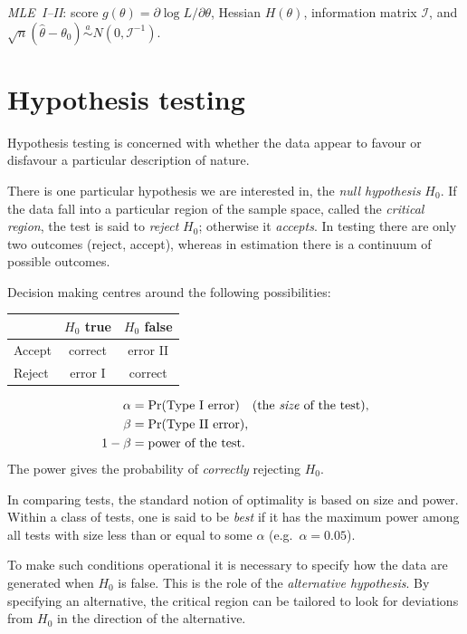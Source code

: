 \documentclass[11pt]{article}
\begin{document}

 \emph{MLE~I--II}: score $g(\theta)=\partial\log L/\partial\theta$, Hessian $H(\theta)$,
information matrix $\mathcal I$, and $\sqrt n(\hat\theta-\theta_{0})\overset{a}{\sim}N(0,\mathcal I^{-1})$.

\section{Hypothesis testing}

Hypothesis testing is concerned with whether the data appear to favour or disfavour a particular
description of nature.

There is one particular hypothesis we are interested in, the \emph{null hypothesis} $H_{0}$. If the
data fall into a particular region of the sample space, called the \emph{critical region}, the test
is said to \emph{reject} $H_{0}$; otherwise it \emph{accepts}. In testing there are only two
outcomes (reject, accept), whereas in estimation there is a continuum of possible outcomes.

Decision making centres around the following possibilities:
\begin{center}
\begin{tabular}{l|c|c}
 & $H_{0}$ true & $H_{0}$ false\\ \hline
 Accept & correct & error II\\
 Reject & error I & correct
\end{tabular}
\end{center}
\begin{align*}
 \alpha&=\Pr(\text{Type I error})\quad\text{(the \emph{size} of the test)},\\
 \beta&=\Pr(\text{Type II error}),\\
 1-\beta&=\text{power of the test}.
\end{align*}
The power gives the probability of \emph{correctly} rejecting $H_{0}$.

In comparing tests, the standard notion of optimality is based on size and power. Within a class of
tests, one is said to be \emph{best} if it has the maximum power among all tests with size less than
or equal to some $\alpha$ (e.g.\ $\alpha=0.05$).

To make such conditions operational it is necessary to specify how the data are generated when
$H_{0}$ is false. This is the role of the \emph{alternative hypothesis}. By specifying an
alternative, the critical region can be tailored to look for deviations from $H_{0}$ in the
direction of the alternative.
\end{document}
